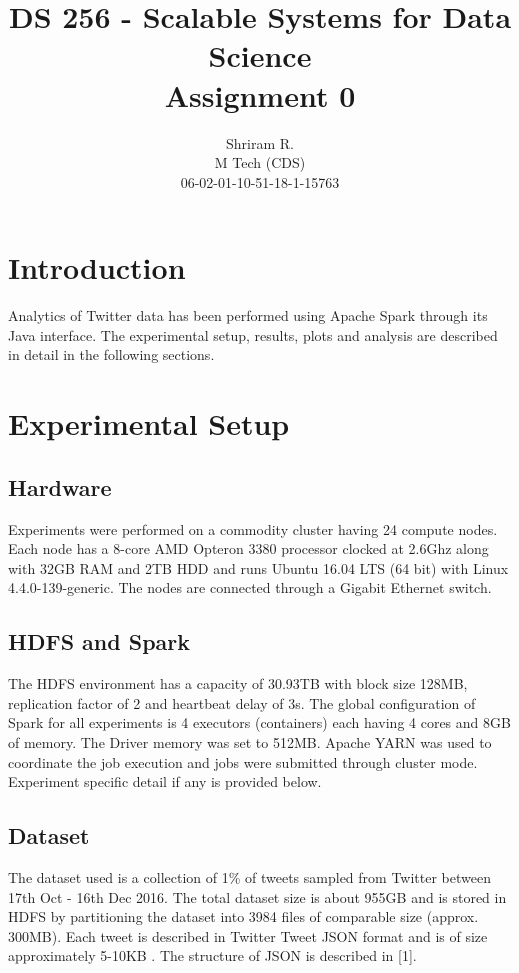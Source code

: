 \documentclass[11pt,a4paper,oneside]{article}
\begin{document}
	\title{DS 256 - Scalable Systems for Data Science \\ Assignment 0}
	\author{Shriram R. \\ M Tech (CDS) \\ 06-02-01-10-51-18-1-15763}
	\maketitle
	
	\section{Introduction}
	Analytics of Twitter data has been performed using Apache Spark through its Java interface. The experimental setup, results, plots and analysis are described in detail in the following sections.
     
    \section{Experimental Setup}
    
    \subsection{Hardware}
    Experiments were performed on a commodity cluster having 24 compute nodes. Each node has a 8-core AMD Opteron 3380 processor clocked at 2.6Ghz along with 32GB RAM and 2TB HDD and runs Ubuntu 16.04 LTS (64 bit) with Linux 4.4.0-139-generic. The nodes are connected through a Gigabit Ethernet switch.
    
    \subsection{HDFS and Spark}
    The HDFS environment has a capacity of 30.93TB with block size 128MB, replication factor of 2 and heartbeat delay of 3s. The global configuration of Spark for all experiments is 4 executors (containers) each having 4 cores and 8GB of memory. The Driver memory was set to 512MB. Apache YARN was used to coordinate the job execution and jobs were submitted through cluster mode. Experiment specific detail if any is provided below.
    
    \subsection{Dataset}
    The dataset used is a collection of 1\% of tweets sampled from Twitter between 17th Oct - 16th Dec 2016. The total dataset size is about 955GB and is stored in HDFS by partitioning the dataset into 3984 files of comparable size (approx. 300MB). Each tweet is described in Twitter Tweet JSON format and is of size approximately 5-10KB . The structure of JSON is described in [1].
  
\end{document}
